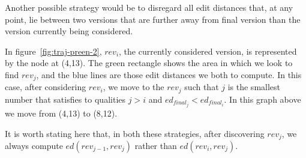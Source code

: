 Another possible strategy would be to disregard all edit distances
that, at any point, lie between two versions that are further away
from final version than the version currently being considered.

In figure~\ref{fig:traj-preen-2}, $rev_i$, the currently considered
version, is represented by the node at (4,13). The green rectangle
shows the area in which we look to find $rev_j$, and the blue lines
are those edit distances we both to compute. In this case, after
considering $rev_i$, we move to the $rev_j$ such that $j$ is the
smallest number that satisfies to qualities $j > i$ and $ed_{final_j}
< ed_{final_i}$. In this graph above we move from (4,13) to (8,12).

It is worth stating here that, in both these strategies, after
discovering $rev_j$, we always compute $ed(rev_{j-1}, rev_j)$ rather
than $ed(rev_i,rev_j)$. 

